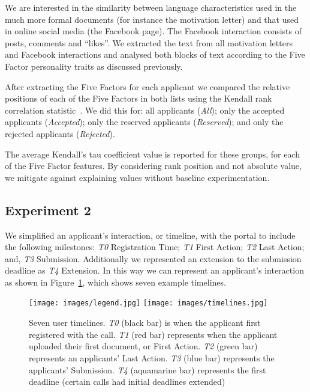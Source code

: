 \documentclass[letterpaper]{article}
\begin{document}
We are interested in the similarity between language characteristics
used in the much more formal documents (for instance the motivation
letter) and that used in online social media (the Facebook page). The
Facebook interaction consists of posts, comments and ``likes''. We
extracted the text from all motivation letters and Facebook
interactions and analysed both blocks of text according to the Five
Factor personality traits as discussed previously.
 
After extracting the Five Factors for each applicant we compared the
relative positions of each of the Five Factors in both lists using the
Kendall rank correlation statistic~\cite{kendall:1938}. We did
this for: all applicants ({\emph{All}}); only the accepted applicants
({\emph{Accepted}}); only the reserved applicants ({\emph{Reserved}});
and only the rejected applicants ({\emph{Rejected}}).

The average Kendall's tau coefficient value is reported for these
groups, for each of the Five Factor features. By considering rank
position and not absolute value, we mitigate against explaining values
without baseline experimentation.

\subsection{Experiment 2}

We simplified an applicant's interaction, or timeline, with the portal
to include the following milestones: {\emph{T0}} Registration Time;
{\emph{T1}} First Action; {\emph{T2}} Last Action; and, {\emph{T3}}
Submission. Additionally we represented an extension to the submission
deadline as {\emph{T4}} Extension. In this way we can represent an
applicant's interaction as shown in Figure~\ref{fig:timelines}, which
shows seven example timelines.

\begin{figure}[!ht]
\centering
\texttt{[image: images/legend.jpg]}
\texttt{[image: images/timelines.jpg]}
\caption{Seven user timelines. {\emph{T0}} (black bar) is when the applicant first
registered with the call. {\emph{T1}} (red bar) represents when the applicant
uploaded their first document, or First Action. {\emph{T2}} (green bar)
represents an applicants' Last Action. {\emph{T3}} (blue bar) represents the
applicants' Submission. {\emph{T4}} (aquamarine bar) represents the first
deadline (certain calls had initial deadlines extended)}
\label{fig:timelines}
\end{figure}
\end{document}
